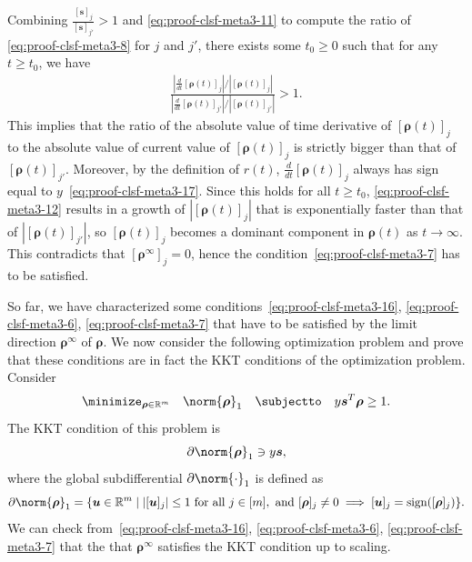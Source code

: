 \documentclass{article} %
\def\vs{{\bm{s}}}
\def\vu{{\bm{u}}}
\def\vv{{\bm{v}}}
\def\mU{{\bm{U}}}
\newcommand{\R}{\mathbb{R}}
\DeclareMathOperator{\sign}{sign}
\newcommand{\vrho}{{\bm{\rho}}}
\begin{document}
Combining $\frac{[\vs]_j}{[\vs]_{j'}} > 1$ and \eqref{eq:proof-clsf-meta3-11} to compute the ratio of \eqref{eq:proof-clsf-meta3-8} for $j$ and $j'$, there exists some $t_0 \geq 0$ such that for any $t \geq t_0$, we have
\begin{align}
\label{eq:proof-clsf-meta3-12}
    \frac{\left | \frac{d}{dt} [\vrho(t)]_j \right |/|[\vrho(t)]_j|}
    {\left | \frac{d}{dt} [\vrho(t)]_{j'} \right |/|[\vrho(t)]_{j'}|}
    > 1.
\end{align}
This implies that the ratio of the absolute value of time derivative of $[\vrho(t)]_j$ to the absolute value of current value of $[\vrho(t)]_j$ is strictly bigger than that of $[\vrho(t)]_{j'}$. 
Moreover, by the definition of $r(t)$, $\frac{d}{dt} [\vrho(t)]_j$ always has sign equal to $y$~\eqref{eq:proof-clsf-meta3-17}. Since this holds for all $t \geq t_0$, \eqref{eq:proof-clsf-meta3-12} results in a growth of $|[\vrho(t)]_j|$ that is exponentially faster than that of $|[\vrho(t)]_{j'}|$, so $[\vrho(t)]_j$ becomes a dominant component in $\vrho(t)$ as $t \to \infty$. This contradicts that $[\vrho^\infty]_j = 0$, hence the condition~\eqref{eq:proof-clsf-meta3-7} has to be satisfied.

So far, we have characterized some conditions~\eqref{eq:proof-clsf-meta3-16}, \eqref{eq:proof-clsf-meta3-6}, \eqref{eq:proof-clsf-meta3-7} that have to be satisfied by the limit direction $\vrho^\infty$ of $\vrho$. We now consider the following optimization problem and prove that these conditions are in fact the KKT conditions of the optimization problem.
Consider 
\begin{equation}
\label{eq:proof-clsf-meta3-13}
    \minimize_{\vrho \in \R^m}\quad \norm{\vrho}_{1}
    \quad
    \subjectto \quad y \vs^T \vrho \geq 1.
\end{equation}
The KKT condition of this problem is
\begin{equation*}
    \partial \norm{\vrho}_{1} \ni y \vs,
\end{equation*}
where the global subdifferential $\partial \norm{\cdot}_{1}$ is defined as
\begin{equation*}
    \partial \norm{\vrho}_{1}
    =
    \{ \vu \in \R^m \mid |[\vu]_j| \leq 1 \text{ for all } j \in [m], \text{ and } [\vrho]_j \neq 0 \implies [\vu]_j = \sign([\vrho]_j)\}.
\end{equation*}
We can check from~\eqref{eq:proof-clsf-meta3-16}, \eqref{eq:proof-clsf-meta3-6}, \eqref{eq:proof-clsf-meta3-7} that the that $\vrho^\infty$ satisfies the KKT condition up to scaling.
\end{document}
